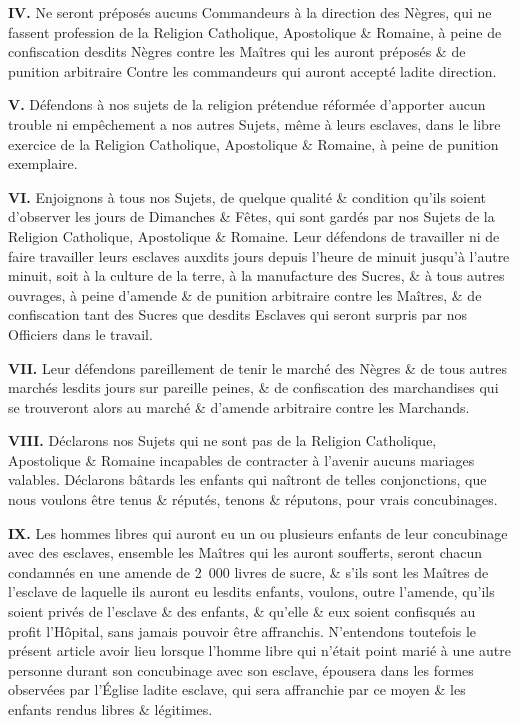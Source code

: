 \documentclass[twoside]{book} %
\newcommand{\labelchar}[1]{\textbf{\color{rubric} #1}}
\begin{document}
\labelchar{IV.} Ne seront préposés aucuns Commandeurs à la direction des Nègres, qui ne fassent profession de la Religion Catholique, Apostolique \& Romaine, à peine de confiscation desdits Nègres contre les Maîtres qui les auront préposés \& de punition arbitraire Contre les commandeurs qui auront accepté ladite direction.\par
\labelchar{V.} Défendons à nos sujets de la religion prétendue réformée d’apporter aucun trouble ni empêchement a nos autres Sujets, même à leurs esclaves, dans le libre exercice de la Religion Catholique, Apostolique \& Romaine, à peine de punition exemplaire.\par
\labelchar{VI.} Enjoignons à tous nos Sujets, de quelque qualité \& condition qu’ils soient d’observer les jours de Dimanches \& Fêtes, qui sont gardés par nos Sujets de la Religion Catholique, Apostolique \& Romaine. Leur défendons de travailler ni de faire travailler leurs esclaves auxdits jours depuis l’heure de minuit jusqu’à l’autre minuit, soit à la culture de la terre, à la manufacture des Sucres, \& à tous autres ouvrages, à peine d’amende \& de punition arbitraire contre les Maîtres, \& de confiscation tant des Sucres que desdits Esclaves qui seront surpris par nos Officiers dans le travail.\par
\labelchar{VII.} Leur défendons pareillement de tenir le marché des Nègres \& de tous autres marchés lesdits jours sur pareille peines, \& de confiscation des marchandises qui se trouveront alors au marché \& d’amende arbitraire contre les Marchands.\par
\labelchar{VIII.} Déclarons nos Sujets qui ne sont pas de la Religion Catholique, Apostolique \& Romaine incapables de contracter à l’avenir aucuns mariages valables. Déclarons bâtards les enfants qui naîtront de telles conjonctions, que nous voulons être tenus \& réputés, tenons \& réputons, pour vrais concubinages.\par
\labelchar{IX.} Les hommes libres qui auront eu un ou plusieurs enfants de leur concubinage avec des esclaves, ensemble les Maîtres qui les auront soufferts, seront chacun condamnés en une amende de 2 000 livres de sucre, \& s’ils sont les Maîtres de l’esclave de laquelle ils auront eu lesdits enfants, voulons, outre l’amende, qu’ils soient privés de l’esclave \& des enfants, \& qu’elle \& eux soient confisqués au profit l’Hôpital, sans jamais pouvoir être affranchis. N’entendons toutefois le présent article avoir lieu lorsque l’homme libre qui n’était point marié à une autre personne durant son concubinage avec son esclave, épousera dans les formes observées par l’Église ladite esclave, qui sera affranchie par ce moyen \& les enfants rendus libres \& légitimes.\par
\end{document}
